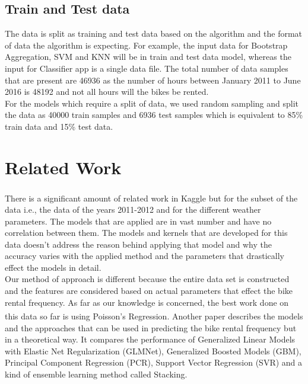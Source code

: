 \documentclass[journal, a4paper]{IEEEtran}
\begin{document}
\subsection{Train and Test data}
The data is split as training and test data based on the algorithm and the format of data the algorithm is expecting. For example, the input data for Bootstrap Aggregation, SVM and KNN will be in train and test data model, whereas the input for Classifier app is a single data file. The total number of data samples that are present are 46936 as the number of hours between January 2011 to June 2016 is 48192 and not all hours will the bikes be rented.\\
\indent For the models which require a split of data, we used random sampling and split the data as 40000 train samples and 6936 test samples which is equivalent to 85\% train data and 15\% test data.

\section{Related Work}
There is a significant amount of related work in Kaggle\textsuperscript{\cite{kaggle}} but for the subset of the data i.e., the data of the years 2011-2012 and for the different weather parameters. The models that are applied are in vast number and have no correlation between them. The models and kernels that are developed for this data doesn't address the reason behind applying that model and why the accuracy varies with the applied method and the parameters that drastically effect the models in detail. \\
\indent Our method of approach is different because the entire data set is constructed and the features are considered based on actual parameters that effect the bike rental frequency. As far as our knowledge is concerned, the best work done on this data so far is using Poisson's Regression\textsuperscript{\cite{relatedworkpoisson}}. Another paper\textsuperscript{\cite{relatedworkmultiple}} describes the models and the approaches that can be used in predicting the bike rental frequency but in a theoretical way. It compares the performance of Generalized Linear Models with Elastic Net Regularization (GLMNet), Generalized Boosted Models (GBM), Principal Component Regression (PCR), Support Vector Regression (SVR) and a kind of ensemble learning method called Stacking.
\end{document}
